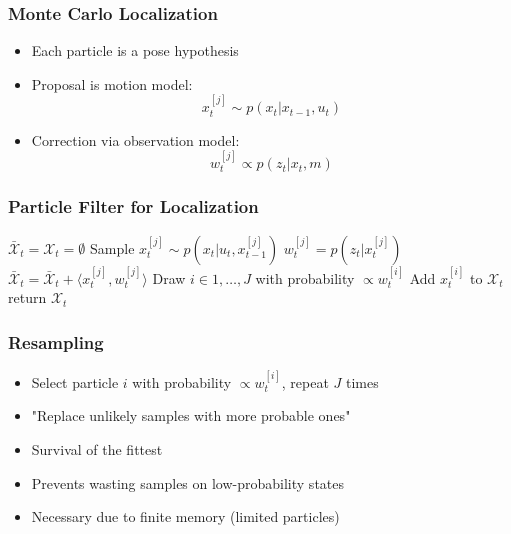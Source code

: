 \begin{frame}
    \frametitle{Monte Carlo Localization}

    \begin{itemize}
        \item Each particle is a pose hypothesis
        \item Proposal is motion model:
        \begin{equation*}
            x_t^{[j]} \sim p(x_t | x_{t-1}, u_t)
        \end{equation*}
        \item Correction via observation model:
        \begin{equation*}
            w_t^{[j]} \propto p(z_t | x_t, m)
        \end{equation*}
    \end{itemize}
\end{frame}

\begin{frame}
    \frametitle{Particle Filter for Localization}

    \begin{algorithmic}[1]
        \State $\bar{\mathcal{X}}_t = \mathcal{X}_t = \emptyset$
            \State Sample $x_t^{[j]} \sim p(x_t | u_t, x_{t-1}^{[j]})$
            \State $w_t^{[j]} = p(z_t | x_t^{[j]})$
            \State $\bar{\mathcal{X}}_t = \bar{\mathcal{X}}_t + \langle x_t^{[j]}, w_t^{[j]}\rangle$
        \EndFor
            \State Draw $i \in 1,\ldots,J$ with probability $\propto w_t^{[i]}$
            \State Add $x_t^{[i]}$ to $\mathcal{X}_t$
        \EndFor
        \State return $\mathcal{X}_t$
    \EndProcedure
    \end{algorithmic}
\end{frame}

\begin{frame}
    \frametitle{Resampling}

    \begin{itemize}
        \item Select particle $i$ with probability $\propto w_t^{[i]}$, repeat $J$ times
        \item "Replace unlikely samples with more probable ones"
        \item Survival of the fittest
        \item Prevents wasting samples on low-probability states
        \item Necessary due to finite memory (limited particles)
    \end{itemize}
\end{frame}

